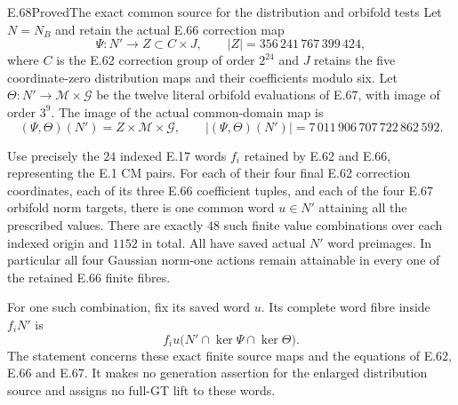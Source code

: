 \begin{statement}{E.68}{Proved}{The exact common source for the distribution and orbifold tests}
Let $N=N_B$ and retain the actual E.66 correction map
\[
 \Psi:N'\longrightarrow Z\subset C\times J,
 \qquad |Z|=356\,241\,767\,399\,424,
 \tag{E.68.1}
\]
where $C$ is the E.62 correction group of order $2^{24}$
and $J$ retains the five coordinate-zero distribution maps
and their coefficients modulo six. Let
$\Theta:N'\to\mathcal M\times\mathcal G$ be the twelve
literal orbifold evaluations of E.67, with image of order
$3^9$. The image of the actual common-domain map is
\[
 (\Psi,\Theta)(N')=Z\times\mathcal M\times\mathcal G,
 \qquad
 |(\Psi,\Theta)(N')|=7\,011\,906\,707\,722\,862\,592.
 \tag{E.68.2}
\]

Use precisely the $24$ indexed E.17 words $f_i$ retained
by E.62 and E.66, representing the E.1 CM pairs. For each
of their four final E.62 correction coordinates, each of
its three E.66 coefficient tuples, and each of the four
E.67 orbifold norm targets, there is one common word
$u\in N'$ attaining all the prescribed values.
There are exactly $48$ such finite value combinations
over each indexed origin and $1152$ in total. All have
saved actual $N'$ word preimages. In particular all four
Gaussian norm-one actions remain attainable in every
one of the retained E.66 finite fibres.

For one such combination, fix its saved word $u$. Its
complete word fibre inside $f_iN'$ is
\[
       f_i u\bigl(N'\cap\ker\Psi\cap\ker\Theta\bigr).
 \tag{E.68.3}
\]
The statement concerns these exact finite source maps
and the equations of E.62, E.66 and E.67. It makes no
generation assertion for the enlarged distribution
source and assigns no full-GT lift to these words.
\end{statement}
